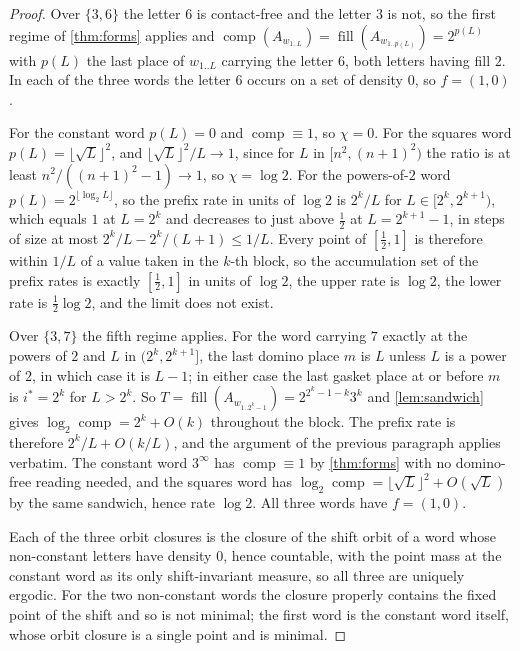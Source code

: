 \documentclass[11pt]{amsart}
\theoremstyle{definition}
\theoremstyle{remark}
\DeclareMathOperator{\comp}{comp}
\DeclareMathOperator{\fil}{fill}
\begin{document}
\begin{proof}
Over $\{3,6\}$ the letter $6$ is contact-free and the letter $3$ is not, so the first regime of \cref{thm:forms} applies and $\comp(A_{w_{1..L}}) = \fil(A_{w_{1..p(L)}}) = 2^{p(L)}$ with $p(L)$ the last place of $w_{1..L}$ carrying the letter $6$, both letters having fill $2$. In each of the three words the letter $6$ occurs on a set of density $0$, so $f = (1,0)$.

For the constant word $p(L) = 0$ and $\comp \equiv 1$, so $\chi = 0$. For the squares word $p(L) = \lfloor \sqrt L\rfloor^2$, and $\lfloor\sqrt L\rfloor^2/L \to 1$, since for $L$ in $[n^2, (n+1)^2)$ the ratio is at least $n^2/((n+1)^2-1) \to 1$, so $\chi = \log 2$. For the powers-of-$2$ word $p(L) = 2^{\lfloor \log_2 L\rfloor}$, so the prefix rate in units of $\log 2$ is $2^k/L$ for $L \in [2^k, 2^{k+1})$, which equals $1$ at $L = 2^k$ and decreases to just above $\tfrac12$ at $L = 2^{k+1}-1$, in steps of size at most $2^k/L - 2^k/(L+1) \le 1/L$. Every point of $[\tfrac12, 1]$ is therefore within $1/L$ of a value taken in the $k$-th block, so the accumulation set of the prefix rates is exactly $[\tfrac12, 1]$ in units of $\log 2$, the upper rate is $\log 2$, the lower rate is $\tfrac12\log 2$, and the limit does not exist.

Over $\{3,7\}$ the fifth regime applies. For the word carrying $7$ exactly at the powers of $2$ and $L$ in $(2^k, 2^{k+1}]$, the last domino place $m$ is $L$ unless $L$ is a power of $2$, in which case it is $L - 1$; in either case the last gasket place at or before $m$ is $i^* = 2^k$ for $L > 2^k$. So $T = \fil(A_{w_{1..2^k-1}}) = 2^{2^k-1-k}3^{k}$ and \cref{lem:sandwich} gives $\log_2 \comp = 2^k + O(k)$ throughout the block. The prefix rate is therefore $2^k/L + O(k/L)$, and the argument of the previous paragraph applies verbatim. The constant word $3^\infty$ has $\comp \equiv 1$ by \cref{thm:forms} with no domino-free reading needed, and the squares word has $\log_2\comp = \lfloor\sqrt L\rfloor^2 + O(\sqrt L)$ by the same sandwich, hence rate $\log 2$. All three words have $f = (1,0)$.

Each of the three orbit closures is the closure of the shift orbit of a word whose non-constant letters have density $0$, hence countable, with the point mass at the constant word as its only shift-invariant measure, so all three are uniquely ergodic. For the two non-constant words the closure properly contains the fixed point of the shift and so is not minimal; the first word is the constant word itself, whose orbit closure is a single point and is minimal.
\end{proof}
\end{document}
